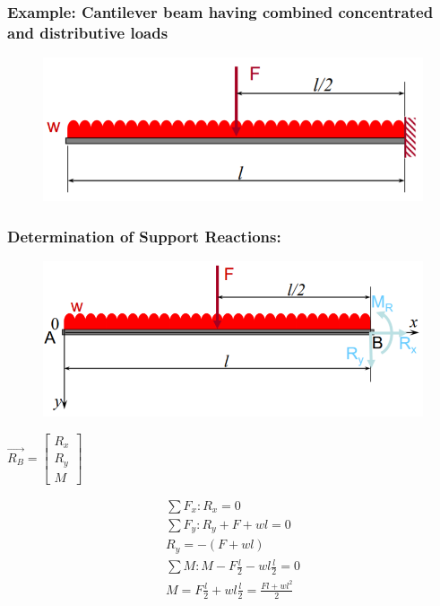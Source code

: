 \documentclass[class=report, crop=false, 12pt,a4paper]{standalone}
\begin{document}
\subsubsection{Example: Cantilever beam having combined concentrated and distributive loads}
\begin{figure}[H]
  \centering
  \includegraphics[width = 0.7 \textwidth]{../img/cantileverbeam.PNG}
\end{figure}
\subsubsection{Determination of Support Reactions:}
\begin{figure}[H]
  \centering
  \includegraphics[width = 0.75 \textwidth]{../img/supportreactions.PNG}
\end{figure}
\begin{center}
  $\vec{R_B} = \left[ \begin{array}{ccc} R_x \\ R_y \\ M \end{array}\right]$
\end{center}
\begin{gather}
  \sum F_x: R_x = 0 \\
  \sum F_y: R_y + F + wl = 0 \\
  R_y = -(F+wl) \\
  \sum M: M - F\frac{l}{2} - wl\frac{l}{2} = 0 \\
  M = F\frac{l}{2} + wl\frac{l}{2} = \frac{Fl+wl^2}{2}
\end{gather}
\end{document}

